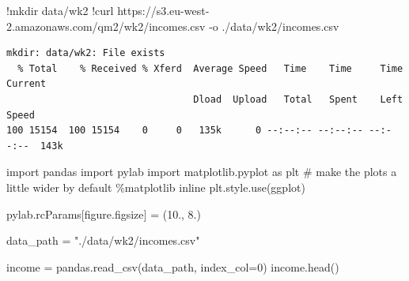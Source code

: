 \documentclass[
  letterpaper,
  DIV=11,
  numbers=noendperiod]{scrreprt}
\newenvironment{Shaded}{\begin{snugshade}}{\end{snugshade}}
\newcommand{\CommentTok}[1]{\textcolor[rgb]{0.37,0.37,0.37}{#1}}
\newcommand{\DecValTok}[1]{\textcolor[rgb]{0.68,0.00,0.00}{#1}}
\newcommand{\ErrorTok}[1]{\textcolor[rgb]{0.68,0.00,0.00}{#1}}
\newcommand{\FloatTok}[1]{\textcolor[rgb]{0.68,0.00,0.00}{#1}}
\newcommand{\ImportTok}[1]{\textcolor[rgb]{0.00,0.46,0.62}{#1}}
\newcommand{\NormalTok}[1]{\textcolor[rgb]{0.00,0.23,0.31}{#1}}
\newcommand{\OperatorTok}[1]{\textcolor[rgb]{0.37,0.37,0.37}{#1}}
\newcommand{\StringTok}[1]{\textcolor[rgb]{0.13,0.47,0.30}{#1}}
\begin{document}
\begin{Shaded}
\begin{Highlighting}[]
\OperatorTok{!}\NormalTok{mkdir data}\OperatorTok{/}\NormalTok{wk2}
\OperatorTok{!}\NormalTok{curl https:}\OperatorTok{//}\NormalTok{s3.eu}\OperatorTok{{-}}\NormalTok{west}\OperatorTok{{-}}\FloatTok{2.}\ErrorTok{amazonaws}\NormalTok{.com}\OperatorTok{/}\NormalTok{qm2}\OperatorTok{/}\NormalTok{wk2}\OperatorTok{/}\NormalTok{incomes.csv }\OperatorTok{{-}}\NormalTok{o .}\OperatorTok{/}\NormalTok{data}\OperatorTok{/}\NormalTok{wk2}\OperatorTok{/}\NormalTok{incomes.csv}
\end{Highlighting}
\end{Shaded}

\begin{verbatim}
mkdir: data/wk2: File exists
  % Total    % Received % Xferd  Average Speed   Time    Time     Time  Current
                                 Dload  Upload   Total   Spent    Left  Speed
100 15154  100 15154    0     0   135k      0 --:--:-- --:--:-- --:--:--  143k
\end{verbatim}

\begin{Shaded}
\begin{Highlighting}[]
\ImportTok{import}\NormalTok{ pandas}
\ImportTok{import}\NormalTok{ pylab}
\ImportTok{import}\NormalTok{ matplotlib.pyplot }\ImportTok{as}\NormalTok{ plt}
\CommentTok{\# make the plots a little wider by default}
\OperatorTok{\%}\NormalTok{matplotlib inline}
\NormalTok{plt.style.use(}\StringTok{\textquotesingle{}ggplot\textquotesingle{}}\NormalTok{)}

\NormalTok{pylab.rcParams[}\StringTok{\textquotesingle{}figure.figsize\textquotesingle{}}\NormalTok{] }\OperatorTok{=}\NormalTok{ (}\FloatTok{10.}\NormalTok{, }\FloatTok{8.}\NormalTok{)}
\end{Highlighting}
\end{Shaded}

\begin{Shaded}
\begin{Highlighting}[]
\NormalTok{data\_path }\OperatorTok{=} \StringTok{"./data/wk2/incomes.csv"}

\NormalTok{income }\OperatorTok{=}\NormalTok{  pandas.read\_csv(data\_path, index\_col}\OperatorTok{=}\DecValTok{0}\NormalTok{)}
\NormalTok{income.head()}
\end{Highlighting}
\end{Shaded}
\end{document}
